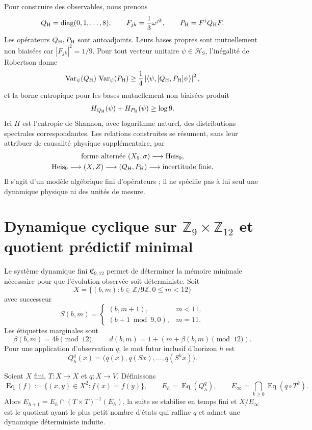 Pour construire des observables, nous prenons
\[
Q_{\rm H}=\operatorname{diag}(0,1,\ldots,8),
\qquad
F_{jk}=\frac13\omega^{jk},
\qquad
P_{\rm H}=F^\dagger Q_{\rm H}F.
\]
Les opérateurs \(Q_{\rm H},P_{\rm H}\) sont autoadjoints. Leurs bases propres sont mutuellement
non biaisées car \(|F_{jk}|^2=1/9\). Pour tout vecteur unitaire
\(\psi\in\mathcal H_9\), l'inégalité de Robertson donne
\[
\operatorname{Var}_\psi(Q_{\rm H})\,
\operatorname{Var}_\psi(P_{\rm H})
\ge
\frac14\left|\langle\psi,[Q_{\rm H},P_{\rm H}]\psi\rangle\right|^2,
\]
et la borne entropique pour les bases mutuellement non biaisées produit
\[
H_{Q_{\rm H}}(\psi)+H_{P_{\rm H}}(\psi)\ge\log9.
\]
Ici \(H\) est l'entropie de Shannon, avec logarithme naturel, des
distributions spectrales correspondantes. Les relations construites se
résument, sans leur attribuer de causalité physique supplémentaire, par
\[
\begin{gathered}
\text{forme alternée }(X_9,\sigma)
\longrightarrow
\operatorname{Heis}_9,\\
\operatorname{Heis}_9\longrightarrow(X,Z)
\longrightarrow(Q_{\rm H},P_{\rm H})
\longrightarrow\text{incertitude finie}.
\end{gathered}
\]
Il s'agit d'un modèle algébrique fini d'opérateurs ; il ne spécifie pas à lui seul
une dynamique physique ni des unités de mesure.

\section{Dynamique cyclique sur \texorpdfstring{\(\mathbb Z_9\times\mathbb Z_{12}\)}{Z9 x Z12} et quotient prédictif minimal}

Le système dynamique fini \(\mathfrak C_{9,12}\) permet de déterminer la mémoire
minimale nécessaire pour que l'évolution observée soit déterministe. Soit
\[
X=\{(b,m):b\in\mathbb Z/9\mathbb Z, 0\le m<12\}
\]
avec successeur
\[
S(b,m)=
\begin{cases}
(b,m+1),&m<11,\\
(b+1\bmod9,0),&m=11.
\end{cases}
\]
Les étiquettes marginales sont
\[
\beta(b,m)=4b\pmod{12},
\qquad
d(b,m)=1+(m+\beta(b,m)\pmod{12}).
\]
Pour une application d'observation \(q\), le mot futur inclusif d'horizon \(h\) est
\[
Q_h^q(x)=\bigl(q(x),q(Sx),\ldots,q(S^hx)\bigr).
\]

\begin{theorem}
Soient \(X\) fini, \(T:X\to X\) et \(q:X\to V\). Définissons
\[
\operatorname{Eq}(f):=\{(x,y)\in X^2:f(x)=f(y)\},
\qquad
E_h=\operatorname{Eq}(Q_h^q),
\qquad
E_\infty=\bigcap_{k\ge0}\operatorname{Eq}(q\circ T^k).
\]
Alors
\(E_{h+1}=E_h\cap(T\times T)^{-1}(E_h)\), la suite se stabilise en temps
fini et \(X/E_\infty\) est le quotient ayant le plus petit nombre d'états qui
raffine \(q\) et admet une dynamique déterministe induite.
\end{theorem}

